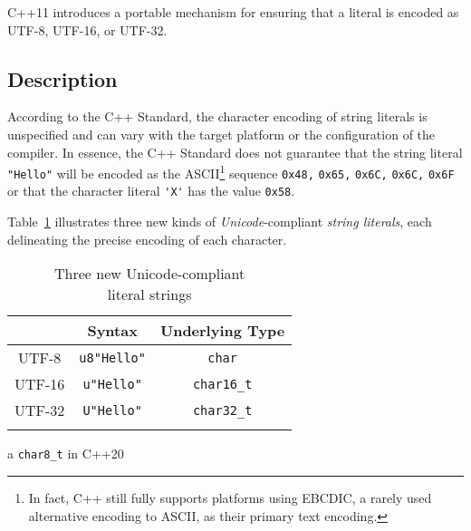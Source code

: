 
\setcounter{table}{0}
\setcounter{footnote}{0}
\setcounter{lstlisting}{0}

C++11 introduces a portable mechanism for ensuring that a literal is
encoded as UTF-8, UTF-16, or UTF-32.

\subsection[Description]{Description}\label{description-unicodestring}

According to the C++ Standard, the character encoding of string literals
is unspecified and can vary with the target platform or the configuration of
the compiler. In essence, the C++ Standard does not guarantee that the
string literal \lstinline!"Hello"! will be encoded as the
ASCII{\cprotect\footnote{In fact, C++ still fully supports platforms
  using EBCDIC, a rarely used alternative encoding to ASCII, as their primary text encoding.}} sequence
\lstinline!0x48,! \lstinline!0x65,! \lstinline!0x6C,! \lstinline!0x6C,! \lstinline!0x6F!
or that the character literal \lstinline!'X'! has the value
\lstinline!0x58!.

Table~\ref{unicodestring-table1} illustrates three new kinds of \emph{Unicode}-compliant
\emph{string literals}, each delineating the precise encoding of each
character.
 \begin{table}[h!]
\begin{center}
\begin{threeparttable}
\caption{Three new Unicode-compliant\\ literal strings}\label{unicodestring-table1}\vspace{1.5ex}
{\small \begin{tabular}{c|c|c}\thickhline
\rowcolor[gray]{.9}{\sffamily\bfseries Encoding} & {\sffamily\bfseries Syntax} & {\sffamily\bfseries Underlying Type}\\ \hline
UTF-8   &  \lstinline!u8"Hello"! & \lstinline!char!\tnote{a}\\ \hline
UTF-16 & \lstinline!u"Hello"!  & \lstinline!char16_t! \\ \hline
UTF-32  & \lstinline!U"Hello"! & \lstinline!char32_t!\\ \thickhline
\end{tabular}
} %
\begin{tablenotes}{\footnotesize
\item[a]{\lstinline!char8_t! in C++20}
}
\end{tablenotes}
\end{threeparttable}
\end{center} 
\end{table} 


